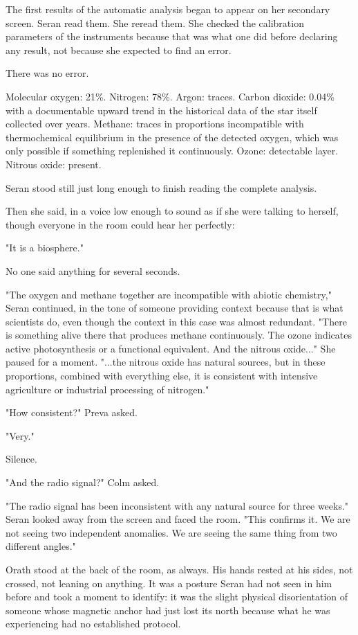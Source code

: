 \documentclass[11pt,a5paper,twoside]{book}
\begin{document}
The first results of the automatic analysis began to appear on her secondary screen. Seran read them. She reread them. She checked the calibration parameters of the instruments because that was what one did before declaring any result, not because she expected to find an error.

There was no error.

Molecular oxygen: 21\%. Nitrogen: 78\%. Argon: traces. Carbon dioxide: 0.04\% with a documentable upward trend in the historical data of the star itself collected over years. Methane: traces in proportions incompatible with thermochemical equilibrium in the presence of the detected oxygen, which was only possible if something replenished it continuously. Ozone: detectable layer. Nitrous oxide: present.

Seran stood still just long enough to finish reading the complete analysis.

Then she said, in a voice low enough to sound as if she were talking to herself, though everyone in the room could hear her perfectly:

"It is a biosphere."

No one said anything for several seconds.

"The oxygen and methane together are incompatible with abiotic chemistry," Seran continued, in the tone of someone providing context because that is what scientists do, even though the context in this case was almost redundant. "There is something alive there that produces methane continuously. The ozone indicates active photosynthesis or a functional equivalent. And the nitrous oxide..." She paused for a moment. "...the nitrous oxide has natural sources, but in these proportions, combined with everything else, it is consistent with intensive agriculture or industrial processing of nitrogen."

"How consistent?" Preva asked.

"Very."

Silence.

"And the radio signal?" Colm asked.

"The radio signal has been inconsistent with any natural source for three weeks." Seran looked away from the screen and faced the room. "This confirms it. We are not seeing two independent anomalies. We are seeing the same thing from two different angles."

Orath stood at the back of the room, as always. His hands rested at his sides, not crossed, not leaning on anything. It was a posture Seran had not seen in him before and took a moment to identify: it was the slight physical disorientation of someone whose magnetic anchor had just lost its north because what he was experiencing had no established protocol.
\end{document}
